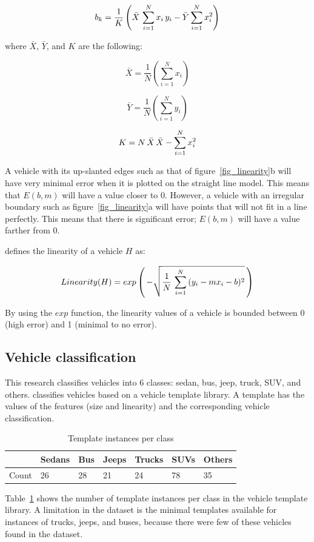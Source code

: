 \documentclass[conference]{IEEEtran}
\begin{document}
$$
b_k = \frac{1}{K} \left( \bar{X} \thinspace \sum_{i=1}^{N} x_i \thinspace y_i - \bar{Y} \sum_{i=1}^{N} x_i^2 \right)
$$

where $\bar{X}$, $\bar{Y}$, and $K$ are the following:

$$
\bar{X} = \frac{1}{N} \left( \sum_{i=1}^{N} x_i \right)
$$

$$
\bar{Y} = \frac{1}{N} \left( \sum_{i=1}^{N} y_i \right)
$$

$$
K = N \thinspace \bar{X} \thinspace \bar{X} - \sum_{i=1}^{N} x_i^2
$$

A vehicle with its up-slanted edges such as that of figure~\ref{fig_linearity}b will have very minimal error when it is plotted on the straight line model. This means that $E(b,m)$ will have a value closer to 0. However, a vehicle with an irregular boundary such as figure~\ref{fig_linearity}a will have points that will not fit in a line perfectly. This means that there is significant error; $E(b,m)$ will have a value farther from 0.

\cite{Jun-Wei} defines the linearity of a vehicle $H$ as:

$$
Linearity(H) = exp \left( \thinspace - \sqrt{\frac{1}{N} \thinspace \sum_{i=1}^{N} \thinspace (y_i - m x_i - b)^2 } \thinspace \right)
$$

By using the $exp$ function, the linearity values of a vehicle is bounded between 0 (high error) and 1 (minimal to no error).


\subsection{Vehicle classification}

This research classifies vehicles into 6 classes: sedan, bus, jeep, truck, SUV, and others.  \cite{Jun-Wei} classifies vehicles based on a vehicle template library. A template has the values of the features (size and linearity) and the corresponding vehicle classification. 
\begin{table}[]
\centering
\caption{Template instances per class}
\label{template_instances}
\begin{tabular}{|l|l|l|l|l|l|l|}
\hline
       & Sedans & Bus & Jeeps & Trucks & SUVs & Others \\ \hline
Count  & 26     & 28  & 21    & 24     & 78   & 35     \\ \hline
\end{tabular}
\end{table}

Table~\ref{template_instances} shows the number of template instances per class in the vehicle template library. A limitation in the dataset is the minimal templates available for instances of trucks, jeeps, and buses, because there were few of these vehicles found in the dataset.
\end{document}
